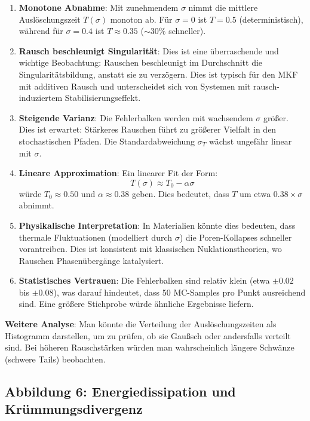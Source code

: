 \documentclass[a4paper,12pt]{article}
\theoremstyle{definition}
\begin{document}
\begin{enumerate}
	\item \textbf{Monotone Abnahme}: Mit zunehmendem $\sigma$ nimmt die mittlere Auslöschungszeit $T(\sigma)$ monoton ab. Für $\sigma = 0$ ist $T = 0.5$ (deterministisch), während für $\sigma = 0.4$ ist $T \approx 0.35$ ($\sim 30\%$ schneller).
	
	\item \textbf{Rausch beschleunigt Singularität}: Dies ist eine überraschende und wichtige Beobachtung: Rauschen beschleunigt im Durchschnitt die Singularitätsbildung, anstatt sie zu verzögern. Dies ist typisch für den MKF mit additiven Rausch und unterscheidet sich von Systemen mit rausch-induziertem Stabilisierungseffekt.
	
	\item \textbf{Steigende Varianz}: Die Fehlerbalken werden mit wachsendem $\sigma$ größer. Dies ist erwartet: Stärkeres Rauschen führt zu größerer Vielfalt in den stochastischen Pfaden. Die Standardabweichung $\sigma_T$ wächst ungefähr linear mit $\sigma$.
	
	\item \textbf{Lineare Approximation}: Ein linearer Fit der Form:
	\[
	T(\sigma) \approx T_0 - \alpha \sigma
	\]
	würde $T_0 \approx 0.50$ und $\alpha \approx 0.38$ geben. Dies bedeutet, dass $T$ um etwa $0.38 \times \sigma$ abnimmt.
	
	\item \textbf{Physikalische Interpretation}: In Materialien könnte dies bedeuten, dass thermale Fluktuationen (modelliert durch $\sigma$) die Poren-Kollapses schneller vorantreiben. Dies ist konsistent mit klassischen Nuklationstheorien, wo Rauschen Phasenübergänge katalysiert.
	
	\item \textbf{Statistisches Vertrauen}: Die Fehlerbalken sind relativ klein (etwa $\pm 0.02$ bis $\pm 0.08$), was darauf hindeutet, dass 50 MC-Samples pro Punkt ausreichend sind. Eine größere Stichprobe würde ähnliche Ergebnisse liefern.
\end{enumerate}

\textbf{Weitere Analyse}: Man könnte die Verteilung der Auslöschungszeiten als Histogramm darstellen, um zu prüfen, ob sie Gaußsch oder andersfalls verteilt sind. Bei höheren Rauschstärken würden man wahrscheinlich längere Schwänze (schwere Tails) beobachten.

\subsection{Abbildung 6: Energiedissipation und Krümmungsdivergenz}
\end{document}
